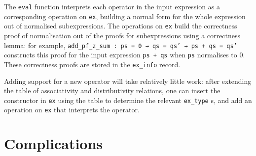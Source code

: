 \documentclass{llncs}
\newcommand{\lean}[1]{\texttt{#1}\xspace} %
\newcommand{\ex}{\lean{ex}}
\newcommand{\ringexp}{\lean{ring\_exp}}
\begin{document}

The \lean{eval} function interprets each operator in the input expression as a corresponding operation on \ex,
building a normal form for the whole expression out of normalised subexpressions.
The operations on \ex build the correctness proof of normalisation out of the proofs for subexpressions
using a correctness lemma: for example, \lean{add\_pf\_z\_sum : ps = 0 → qs = qs' → ps + qs = qs'} constructs this proof for the input expression \lean{ps + qs} when \lean{ps} normalises to $0$.
These correctness proofs are stored in the \lean{ex\_info} record. %

Adding support for a new operator will take relatively little work:
after extending the table of associativity and distributivity relations,
one can insert the constructor in \ex using the table to determine the relevant \lean{ex\_type}s,
and add an operation on \ex that interprets the operator.


\section{Complications} %
\end{document}
